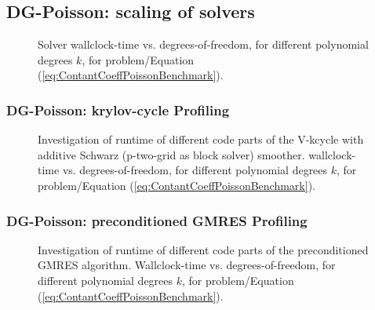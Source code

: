 \subsection{DG-Poisson: scaling of solvers}


\begin{figure}[!h]
	\begin{center}
	\end{center}
	\caption{
		Solver wallclock-time vs. degrees-of-freedom, for different polynomial degrees $k$,
		for problem/Equation (\ref{eq:ContantCoeffPoissonBenchmark}).
	}
	\label{fig:ConstantCoeffRuntimes}
\end{figure}

\newpage

\subsubsection{DG-Poisson: krylov-cycle Profiling}


\begin{figure}[!h]
	\begin{center}
	\end{center}
	\caption{
		Investigation of runtime of different code parts of the V-kcycle with additive Schwarz (p-two-grid as block solver) smoother. wallclock-time vs. degrees-of-freedom, for different polynomial degrees $k$,
		for problem/Equation (\ref{eq:ContantCoeffPoissonBenchmark}).
	}
	\label{fig:SIP_blockJacobianPCG}
\end{figure}
\newpage

\subsubsection{DG-Poisson: preconditioned GMRES Profiling}

\begin{figure}[!h]
	\begin{center}
	\end{center}
	\caption{
		Investigation of runtime of different code parts of the preconditioned GMRES algorithm. Wallclock-time vs. degrees-of-freedom, for different polynomial degrees $k$,
		for problem/Equation (\ref{eq:ContantCoeffPoissonBenchmark}).
	}
	\label{fig:SIP_SchwarzPGC}
\end{figure}
\newpage

